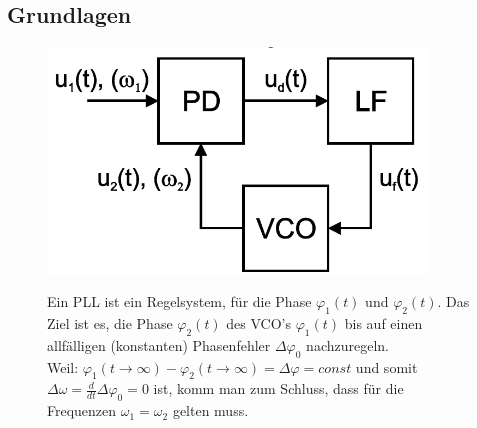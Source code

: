 \subsection{Grundlagen }
\vspace{-0.3cm}
\begin{figure}[h!]
	\begin{minipage}{0.35\textwidth} 
       \includegraphics[width=0.9\textwidth]{images/Prinzip_PLL}\\
	\end{minipage}
	\begin{minipage}{0.55\textwidth}
	   Ein PLL ist ein Regelsystem, für die Phase $\varphi_1(t)$ und $\varphi_2(t)$. Das Ziel ist es, die Phase $\varphi_2(t)$ des  VCO's $\varphi_1(t)$ bis auf einen allfälligen (konstanten) Phasenfehler $\Delta \varphi_0$ nachzuregeln.\\
       Weil: $\varphi _1(t\to \infty ) - \varphi_2(t \to \infty)= \Delta \varphi = const$ und somit $\Delta \omega = \frac{d}{dt}\Delta \varphi_0 = 0$ ist, komm man zum Schluss, dass für die Frequenzen $\omega_1 = \omega_2$ gelten muss.
	\end{minipage}


\end{figure}
